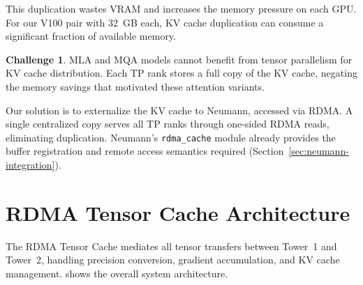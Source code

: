\documentclass[11pt,letterpaper]{article}
\theoremstyle{definition}
\newtheorem{challenge}{Challenge}
\begin{document}
This duplication wastes VRAM and increases the memory pressure on each GPU. For our V100 pair with 32~GB each, KV cache duplication can consume a significant fraction of available memory.

\begin{challenge}
MLA and MQA models cannot benefit from tensor parallelism for KV cache distribution. Each TP rank stores a full copy of the KV cache, negating the memory savings that motivated these attention variants.
\end{challenge}

Our solution is to externalize the KV cache to Neumann, accessed via RDMA. A single centralized copy serves all TP ranks through one-sided RDMA reads, eliminating duplication. Neumann's \texttt{rdma\_cache} module already provides the buffer registration and remote access semantics required (Section~\ref{sec:neumann-integration}).

\section{RDMA Tensor Cache Architecture}
\label{sec:rdma-cache}

The RDMA Tensor Cache mediates all tensor transfers between Tower~1 and Tower~2, handling precision conversion, gradient accumulation, and KV cache management.  shows the overall system architecture.
\end{document}
